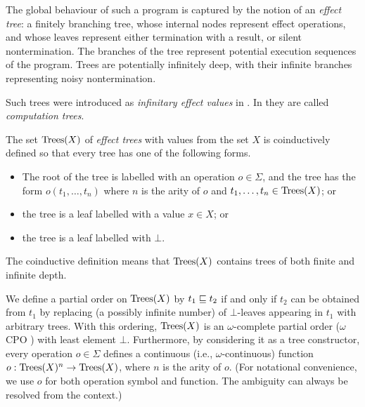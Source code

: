 The global behaviour of such a program is captured by the notion of an \emph{effect tree}: a  finitely branching tree, whose 
internal nodes represent effect operations, and whose leaves represent either termination with a result, or silent nontermination. The branches of the tree represent potential execution sequences of the program. 
Trees are potentially infinitely deep, with their infinite branches representing noisy nontermination.

Such trees were introduced as \emph{infinitary effect values} in  \cite{plotkin2001adequacy}. In \cite{com} they are called
\emph{computation trees}.






The set $\textnormal{Trees}(X)$ of \emph{effect trees} with values from  the set $X$ is coinductively defined so that
every tree has one of the following  forms.
\begin{itemize}
\item The root of the tree is labelled with an operation $o \in \Sigma$, and the tree has the form
         $o(t_1, \dots, t_n)$ where $n$ is the arity of $o$ and $t_1, \dots, t_n \in \textnormal{Trees}(X)$; or
\item the tree is a leaf labelled with a value $x \in X$; or
\item the tree is a leaf labelled with $\bot$.
\end{itemize}
The coinductive definition means that $\textnormal{Trees}(X)$ contains trees of both finite and infinite depth.

We define a partial order on  $\textnormal{Trees}(X)$ by
$t_1 \sqsubseteq t_2$ if and only if $t_2$ can be obtained from $t_1$ by replacing (a possibly infinite number)
of $\bot$-leaves appearing in $t_1$ with arbitrary trees. With this ordering,  $\textnormal{Trees}(X)$  is an $\omega$-complete 
partial order ($\omega$CPO ) with least element $\bot$. Furthermore, by considering it as
a tree constructor,
every operation $o \in \Sigma$  defines a continuous (i.e., $\omega$-continuous) function $o : \textnormal{Trees}(X)^n \to \textnormal{Trees}(X)$, where $n$ is the arity of $o$.
(For notational convenience, we use $o$ for both operation symbol and function. The ambiguity can always be resolved from the context.) 


